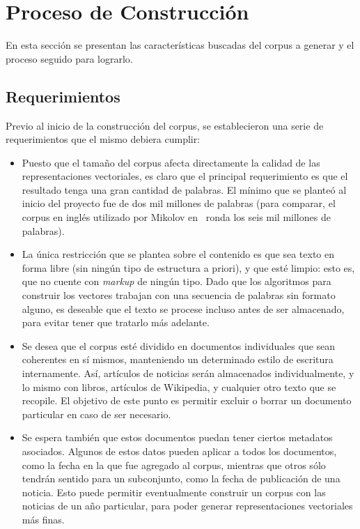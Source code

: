 \section{Proceso de Construcción}

En esta sección se presentan las características buscadas del corpus a generar y el proceso seguido
para lograrlo.

\subsection{Requerimientos}

Previo al inicio de la construcción del corpus, se establecieron una serie de requerimientos que el
mismo debiera cumplir:

\begin{itemize}

\item Puesto que el tamaño del corpus afecta directamente la calidad de las representaciones
vectoriales, es claro que el principal requerimiento es que el resultado tenga una gran cantidad de
palabras. El mínimo que se planteó al inicio del proyecto fue de dos mil millones de palabras (para
comparar, el corpus en inglés utilizado por Mikolov en~\cite{Mikolov2013c} ronda los seis mil
millones de palabras).

\item La única restricción que se plantea sobre el contenido es que sea texto en forma libre (sin
ningún tipo de estructura a priori), y que esté limpio: esto es, que no cuente con \textit{markup}
de ningún tipo. Dado que los algoritmos para construir los vectores trabajan con una secuencia de
palabras sin formato alguno, es deseable que el texto se procese incluso antes de ser almacenado,
para evitar tener que tratarlo más adelante.

\item Se desea que el corpus esté dividido en documentos individuales que sean coherentes en sí
mismos, manteniendo un determinado estilo de escritura internamente. Así, artículos de noticias serán
almacenados individualmente, y lo mismo con libros, artículos de Wikipedia, y cualquier otro texto
que se recopile. El objetivo de este punto es permitir excluir o borrar un documento particular en
caso de ser necesario.

\item Se espera también que estos documentos puedan tener ciertos metadatos asociados. Algunos de
estos datos pueden aplicar a todos los documentos, como la fecha en la que fue agregado al corpus,
mientras que otros sólo tendrán sentido para un subconjunto, como la fecha de publicación de una
noticia. Esto puede permitir eventualmente construir un corpus con las noticias de un año
particular, para poder generar representaciones vectoriales más finas.


\end{itemize}
